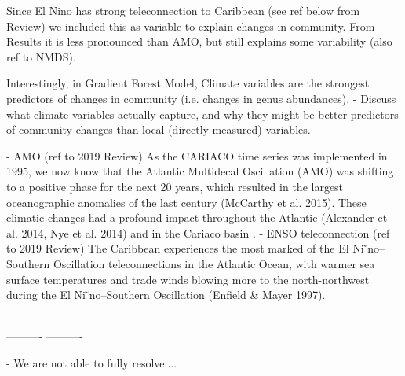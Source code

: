     
    
    Since El Nino has strong teleconnection to Caribbean (see ref below from Review) we included this as variable to explain changes in community. From Results it is less pronounced than AMO, but still explains some variability (also ref to NMDS).

    Interestingly, in Gradient Forest Model, Climate variables are the strongest predictors of changes in community (i.e. changes in genus abundances).
    - Discuss what climate variables actually capture, and why they might be better predictors of community changes than local (directly measured) variables.
    

    - AMO (ref to 2019 Review)
    As the CARIACO time series was implemented in 1995, we now know that the Atlantic Multidecal Oscillation (AMO) was shifting to a positive phase for the next 20 years, which resulted in the largest oceanographic anomalies of the last century (McCarthy et al. 2015). These climatic changes had a profound impact throughout the Atlantic (Alexander et al. 2014, Nye et al. 2014) and in the Cariaco basin \cite{taylor_ecosystem_2012, pinckney_phytoplankton_2015}.
    - ENSO teleconnection (ref to 2019 Review)
    The Caribbean experiences the most marked of the El Ni  ̃no–Southern Oscillation teleconnections in the Atlantic Ocean, with warmer sea surface temperatures and trade winds blowing more to the north-northwest during the El Ni  ̃no–Southern Oscillation (Enfield & Mayer 1997).






 
--------------------------------------------------------------------------
----------
----------
----------
----------
----------




- We are not able to fully resolve....

